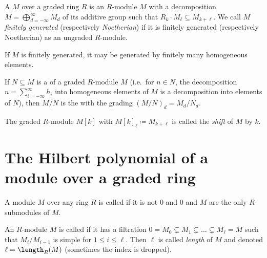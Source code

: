 \documentclass[a4paper,parskip=half,numbers=enddot, DIV=12, headheight=30pt]{scrreprt}
\begin{document}
\begin{defi}
    A  $M$ over a graded ring $R$ is an $R$-module $M$ with a decomposition $M=\bigoplus_{d=-\infty}^\infty M_d$ of its additive group such that $R_k\cdot M_\ell \subseteq M_{k+\ell}$. We call $M$ \emph{finitely generated} (respectively \emph{Noetherian}) if it is finitely generated (respectively Noetherian) as an ungraded $R$-module. 
\end{defi}
\begin{rem}
    If $M$ is finitely generated, it may be generated by finitely many homogeneous elements.
\end{rem}
\begin{defi}
    \begin{alphanumerate}
        \item {}
            If $N\subseteq M$ is a  of a graded $R$-module $M$ (i.e.\ for $n\in N$, the decomposition $n=\sum_{i=-\infty}^\infty h_i$ into homogeneous elements of $M$ is a decomposition into elements of $N$), then $M/N$ is the  with the grading $(M/N)_d = M_d/N_d$.
        \item   
            The graded $R$-module $M[k]$ with $M[k]_\ell \coloneqq M_{k+\ell}$ is called the \emph{shift} of $M$ by $k$.
    \end{alphanumerate}
\end{defi}

\section{The Hilbert polynomial of a module over a graded ring}

\begin{defi}
    \begin{alphanumerate}
    \item 
        A module $M$ over any ring $R$ is called  if it is not $0$ and $0$ and $M$ are the only $R$-submodules of $M$.
    \item {}
        An $R$-module $M$ is called  if it has a filtration $0 = M_0\subsetneq M_1\subsetneq\ldots\subsetneq M_\ell = M$ such that $M_i/M_{i-1}$ is simple for $1\leq i\leq\ell$. Then $\ell$ is called \emph{length} of $M$ and denoted $\ell=\length_R(M)$ (sometimes the index is dropped). 
    \end{alphanumerate}
\end{defi}
\end{document}
